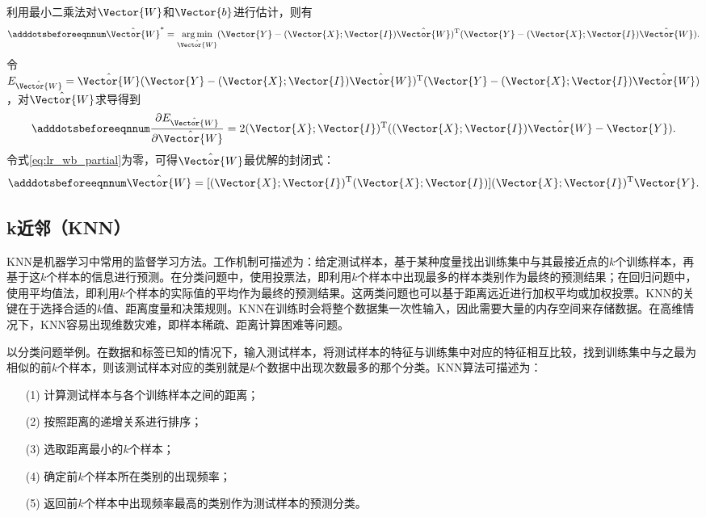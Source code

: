 利用最小二乘法对$\Vector{W}$和$\Vector{b}$进行估计，则有
\begin{equation}\adddotsbeforeeqnnum
  \label{eq:lr_wb}
  \hat{\Vector{W}}^*=\mathop{\arg\min}\limits_{\hat{\Vector{W}}}(\Vector{Y}-(\Vector{X};\Vector{I})\hat{\Vector{W}})^{\text{T}}(\Vector{Y}-(\Vector{X};\Vector{I})\hat{\Vector{W}}).
\end{equation}
令$E_{\hat{\Vector{W}}}={\hat{\Vector{W}}}(\Vector{Y}-(\Vector{X};\Vector{I})\hat{\Vector{W}})^{\text{T}}(\Vector{Y}-(\Vector{X};\Vector{I})\hat{\Vector{W}})$，对$\hat{\Vector{W}}$求导得到
\begin{equation}\adddotsbeforeeqnnum
  \label{eq:lr_wb_partial}
  \frac{\partial{E_{\hat{\Vector{W}}}}}{\partial{\hat{\Vector{W}}}}=2(\Vector{X};\Vector{I})^{\text{T}}((\Vector{X};\Vector{I})\hat{\Vector{W}}-\Vector{Y}).
\end{equation}
令式\ref{eq:lr_wb_partial}为零，可得$\hat{\Vector{W}}$最优解的封闭式：
\begin{equation}\adddotsbeforeeqnnum
  \label{eq:lr_wb_feng}
  \hat{\Vector{W}}=[(\Vector{X};\Vector{I})^{\text{T}}(\Vector{X};\Vector{I})](\Vector{X};\Vector{I})^{\text{T}}\Vector{Y}.
\end{equation}

\subsection{k近邻（KNN）}\label{sec:ml_knn}

KNN是机器学习中常用的监督学习方法。工作机制可描述为：给定测试样本，基于某种度量找出训练集中与其最接近点的$k$个训练样本，再基于这$k$个样本的信息进行预测。在分类问题中，使用投票法，即利用$k$个样本中出现最多的样本类别作为最终的预测结果；在回归问题中，使用平均值法，即利用$k$个样本的实际值的平均作为最终的预测结果。这两类问题也可以基于距离远近进行加权平均或加权投票。KNN的关键在于选择合适的$k$值、距离度量和决策规则。KNN在训练时会将整个数据集一次性输入，因此需要大量的内存空间来存储数据。在高维情况下，KNN容易出现维数灾难，即样本稀疏、距离计算困难等问题。

以分类问题举例。在数据和标签已知的情况下，输入测试样本，将测试样本的特征与训练集中对应的特征相互比较，找到训练集中与之最为相似的前$k$个样本，则该测试样本对应的类别就是$k$个数据中出现次数最多的那个分类。KNN算法可描述为：
\begin{enumerate}
  \item[(1)] 计算测试样本与各个训练样本之间的距离；
  \item[(2)] 按照距离的递增关系进行排序；
  \item[(3)] 选取距离最小的$k$个样本；
  \item[(4)] 确定前$k$个样本所在类别的出现频率；
  \item[(5)] 返回前$k$个样本中出现频率最高的类别作为测试样本的预测分类。
\end{enumerate}

